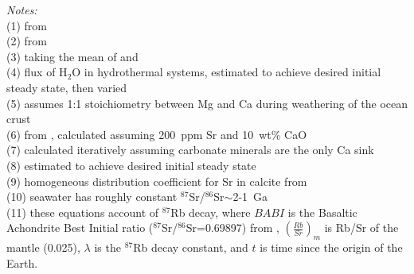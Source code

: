 \documentclass[11pt,letterpaper]{article}
\newcommand{\SrSr}{$^{87}$Sr/$^{86}$Sr\xspace}
\begin{document}
\begin{table}
	\flushleft \emph{Notes:} \\
    (1) from \citet{Turekian1961a}\\
    (2) from \citet{Wedepohl1995a}\\
    (3) taking the mean of \citet{Turekian1961a} and \citet{Taylor1964a}\\
    (4) flux of H$_{2}$O in hydrothermal systems, estimated to achieve desired initial steady state, then varied\\
    (5) assumes 1:1 stoichiometry between Mg and Ca during weathering of the ocean crust\\
    (6) from \citet{Maloof2010a}, calculated assuming 200~ppm Sr and 10~wt\% CaO\\
    (7) calculated iteratively assuming carbonate minerals are the only Ca sink\\
    (8) estimated to achieve desired initial steady state\\
    (9) homogeneous distribution coefficient for Sr in calcite from \citet{Mucci1983a}\\
    (10) seawater has roughly constant \SrSr $\sim$2-1~Ga \citep{Shields2002a}\\
    (11) these equations account of $^{87}$Rb decay, where $BABI$ is the Basaltic Achondrite Best Initial ratio (\SrSr=0.69897) from \citet{Papanastassiou1968a}, $\left(\frac{Rb}{Sr}\right)_{m}$ is Rb/Sr of the mantle (0.025), $\lambda$ is the $^{87}$Rb decay constant, and $t$ is time since the origin of the Earth.
	\label{tab:seawater_model_variables}
\end{table}

\clearpage

\singlespacing

\newpage



\end{document}
